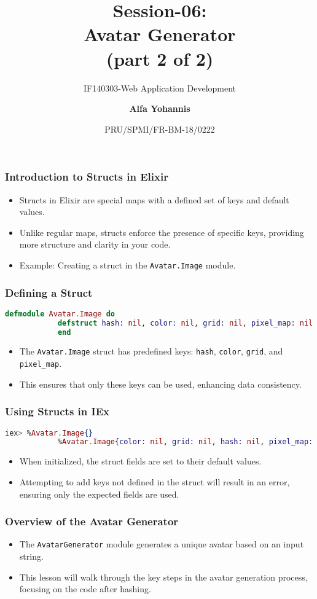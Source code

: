 \documentclass[aspectratio=169, table]{beamer}
\subtitle{IF140303-Web Application Development}
\title{\LARGE{Session-06:\\Avatar Generator\\
		(part 2 of 2)}}
\date[Serial]{\scriptsize {PRU/SPMI/FR-BM-18/0222}}
\author[Pradita]{\small{\textbf{Alfa Yohannis}}}
\begin{document}
	
	\frame{\titlepage}
	
	\begin{frame}
		\frametitle{Introduction to Structs in Elixir}
		\begin{itemize}
			\item Structs in Elixir are special maps with a defined set of keys and default values.
			\item Unlike regular maps, structs enforce the presence of specific keys, providing more structure and clarity in your code.
			\item Example: Creating a struct in the \texttt{Avatar.Image} module.
		\end{itemize}
	\end{frame}
	
	\begin{frame}[fragile]
		\frametitle{Defining a Struct}
		\begin{lstlisting}[language=Elixir]
			defmodule Avatar.Image do
			defstruct hash: nil, color: nil, grid: nil, pixel_map: nil
			end
		\end{lstlisting}
		\begin{itemize}
			\item The \texttt{Avatar.Image} struct has predefined keys: \texttt{hash}, \texttt{color}, \texttt{grid}, and \texttt{pixel\_map}.
			\item This ensures that only these keys can be used, enhancing data consistency.
		\end{itemize}
	\end{frame}
	
	\begin{frame}[fragile]
		\frametitle{Using Structs in IEx}
		\begin{lstlisting}[language=Elixir]
			iex> %Avatar.Image{}
			%Avatar.Image{color: nil, grid: nil, hash: nil, pixel_map: nil}
		\end{lstlisting}
		\begin{itemize}
			\item When initialized, the struct fields are set to their default values.
			\item Attempting to add keys not defined in the struct will result in an error, ensuring only the expected fields are used.
		\end{itemize}
	\end{frame}
	
	\begin{frame}
		\frametitle{Overview of the Avatar Generator}
		\begin{itemize}
			\item The \texttt{AvatarGenerator} module generates a unique avatar based on an input string.
			\item This lesson will walk through the key steps in the avatar generation process, focusing on the code after hashing.
		\end{itemize}
	\end{frame}
	
\end{document}
